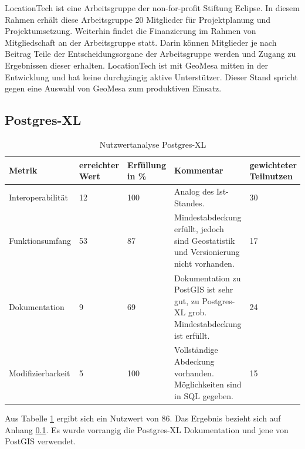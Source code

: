 LocationTech ist eine Arbeitsgruppe der non-for-profit Stiftung Eclipse.
In diesem Rahmen erhält diese Arbeitsgruppe 20 Mitglieder für Projektplanung und Projektumsetzung.
Weiterhin findet die Finanzierung im Rahmen von Mitgliedschaft an der Arbeitsgruppe statt.
Darin können Mitglieder je nach Beitrag Teile der Entscheidungsorgane der Arbeitsgruppe werden und Zugang zu Ergebnissen dieser erhalten. \cite{website:locationtech-about}
LocationTech ist mit GeoMesa mitten in der Entwicklung und hat keine durchgängig aktive Unterstützer.
Dieser Stand spricht gegen eine Auswahl von GeoMesa zum produktiven Einsatz.

\subsection{Postgres-XL}
\label{gegenuerbestellung:postgresxl}
\begin{table}[h!]
\centering
\small
\begin{tabular}{|l|p{1.8cm}|l|p{3.1cm}|p{1.8cm}|}
\hline
\textbf{Metrik} & \textbf{erreichter Wert} & \textbf{Erfüllung in \%} & \textbf{Kommentar} & \textbf{gewichteter Teilnutzen} \\ \hline
Interoperabilität & 12 & 100 & Analog des Ist-Standes. & 30 \\ \hline
Funktionsumfang & 53 & 87 & Mindestabdeckung erfüllt, jedoch sind Geostatistik und Versionierung nicht vorhanden. & 17 \\ \hline
Dokumentation & 9 & 69 & Dokumentation zu PostGIS ist sehr gut, zu Postgres-XL grob. Mindestabdeckung ist erfüllt. & 24 \\ \hline
Modifizierbarkeit & 5 & 100 & Vollständige Abdeckung vorhanden. Möglichkeiten sind in SQL gegeben. & 15 \\ \hline
\end{tabular}
\caption{Nutzwertanalyse Postgres-XL}
\label{table:nutzwertanalyse-postgresxl}
\end{table}
Aus Tabelle \ref{table:nutzwertanalyse-postgresxl} ergibt sich ein Nutzwert von 86.
Das Ergebnis bezieht sich auf Anhang \ref{gegenuerbestellung:postgresxl}.
Es wurde vorrangig die Postgres-XL Dokumentation \cite{website:postgresxl-manual} und jene von PostGIS \cite{website:postgisdocu-functions} verwendet.

